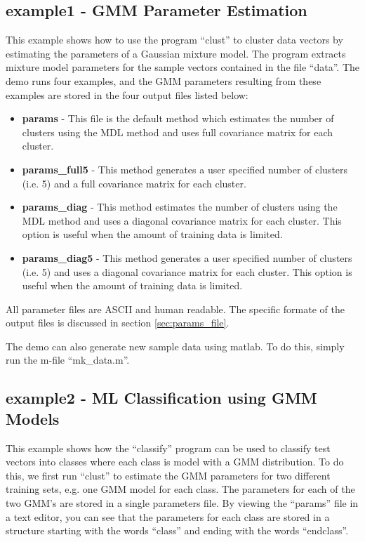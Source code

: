 \documentclass[12pt]{article}
\begin{document}
\subsection{example1 - GMM Parameter Estimation}

This example shows how to use the program ``clust'' 
to cluster data vectors by estimating the parameters
of a Gaussian mixture model. 
The program extracts mixture model
parameters for the sample vectors contained in the file ``data''.
The demo runs four examples, and the GMM parameters
resulting from these examples are stored in the four output files
listed below:
\begin{itemize}
\item[] {\bf params} - This file is the default method which 
estimates the number of clusters using the MDL method
and uses full covariance matrix for each cluster.
\item[] {\bf params\_full5} - This method generates a user
specified number of clusters (i.e. 5) and a full covariance matrix for each cluster.
\item[] {\bf params\_diag} - This method estimates the number 
of clusters using the MDL method
and uses a diagonal covariance matrix for each cluster.
This option is useful when the amount of training data is limited.
\item[] {\bf params\_diag5} - This method generates a user
specified number of clusters (i.e. 5) 
and uses a diagonal covariance matrix for each cluster.
This option is useful when the amount of training data is limited.
\end{itemize}
All parameter files are ASCII and human readable.
The specific formate of the output files is
discussed in section \ref{sec:params_file}.

The demo can also generate new sample data using matlab.
To do this, simply run the m-file ``mk\_data.m''.

\subsection{example2 - ML Classification using GMM Models}

This example shows how the ``classify'' program 
can be used to classify test vectors into classes
where each class is model with a GMM distribution.
To do this, we first run ``clust'' to estimate the GMM
parameters for two different training sets, 
e.g. one GMM model for each class.
The parameters for each of the two GMM's are stored
in a single parameters file. 
By viewing the ``params'' file in a text editor,
you can see that the parameters for each class
are stored in a structure starting with the words ``class''
and ending with the words ``endclass''.
\end{document}
